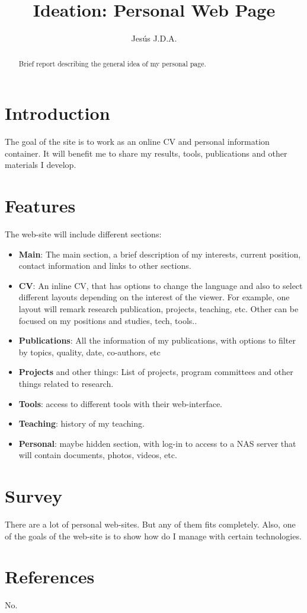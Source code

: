 \documentclass[a4paper]{article}
\title{Ideation: Personal Web Page}
\author{Jes\'us J.D.A.}
\begin{document}
\maketitle

\begin{abstract}
Brief report describing the general idea of my personal page.
\end{abstract}


\section{Introduction}
The goal of the site is to work as an online CV and personal
information container. It will benefit me to share my results, tools,
publications and other materials I develop.

\section{Features}
The web-site will include different sections:
\begin{itemize}
\item \textbf{Main}: The main section, a brief description of my
  interests, current position, contact information and links
  to other sections.
\item \textbf{CV}: An inline CV, that has options to change the
  language and also to select different layouts depending on the
  interest of the viewer. For example, one layout will remark research
  publication, projects, teaching, etc. Other can be focused on my
  positions and studies, tech, tools..

\item \textbf{Publications}: All the information of my publications,
  with options to filter by topics, quality, date, co-authors, etc
\item \textbf{Projects} and other things: List of projects, program
  committees and other things related to research.
\item \textbf{Tools}: access to different tools with their
  web-interface.
\item \textbf{Teaching}: history of my teaching.

\item \textbf{Personal}: maybe hidden section, with log-in to access to
  a NAS server that will contain documents, photos, videos, etc.
\end{itemize}


\section{Survey}
There are a lot of personal web-sites. But any of them fits
completely. Also, one of the goals of the web-site is to show  how do
I manage with certain technologies.

\section{References}

No.
\end{document}
